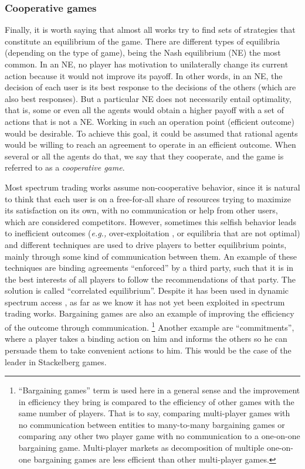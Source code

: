 \subsubsection{Cooperative games}
Finally, it is worth saying that almost all works try to find sets of strategies that constitute an equilibrium of the game.
There are different types of equilibria (depending on the type of game), being the Nash equilibrium (NE) the most common. 
In an NE, no player has motivation to unilaterally change its current action because it would not improve its payoff. 
In other words, in an NE, the decision of each user is its best response to the decisions of the others (which are also best responses). 
But a particular NE does not necessarily entail optimality, that is, some or even all the agents would obtain a higher payoff with a set of actions that is not a NE.
Working in such an operation point (efficient outcome) would be desirable. 
To achieve this goal, it could be assumed that rational agents would be willing to reach an agreement to operate in an efficient outcome. 
When several or all the agents do that, we say that they cooperate, and the game is referred to as a \textit{cooperative game}.

Most spectrum trading works assume non-cooperative behavior, since it is natural to think that each user is on a free-for-all share of resources trying to maximize its satisfaction on its own, with no communication or help from other users, which are considered competitors.
However, sometimes this selfish behavior leads to inefficient outcomes (\textit{e.g.,} over-exploitation \cite{ref:Hardin1968}, or equilibria that are not optimal) and different techniques are used to drive players to better equilibrium points, mainly through some kind of communication between them. 
An example of these techniques are binding agreements ``enforced'' by a third party, such that it is in the best interests of all players to follow the recommendations of that party. 
The solution is called ``correlated equilibrium''. 
Despite it has been used in dynamic spectrum access \cite{ref:Han2007,ref:Maskery2009}, as far as we know it has not yet been exploited in spectrum trading works. 
Bargaining games are also an example of improving the efficiency of the outcome through communication. \footnote{``Bargaining games'' term is used here in a general sense and the improvement in efficiency they bring is compared to the efficiency of other games with the same number of players. That is to say, comparing multi-player games with no communication between entities to many-to-many bargaining games or comparing any other two player game with no communication to a one-on-one bargaining game. Multi-player markets as decomposition of multiple one-on-one bargaining games are less efficient than other multi-player games.} 
Another example are ``commitments'', where a player takes a binding action on him and informs the others so he can persuade them to take convenient actions to him. This would be the case of the leader in Stackelberg games. 

